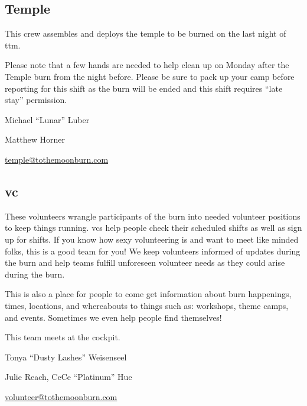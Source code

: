 \begin{multicols}{2}
\subsection*{Temple}
This crew assembles and deploys the \gls{temple} to be burned on the last night of \gls{ttm}.

Please note that a few hands are needed to help clean up on Monday after the Temple burn from the night before. Please be sure to pack up your camp before reporting for this shift as the burn will be ended and this shift requires ``late stay'' permission.

\begin{description}[leftmargin=6em,noitemsep,style=nextline]
   \item[Lead:] Michael ``Lunar'' Luber
   \item[Co-leads:] Matthew Horner
   \item[Contact:] \url{temple@tothemoonburn.com}
\end{description}

\columnbreak

\subsection*{\acrlong{vc}}
These volunteers wrangle participants of the burn into needed volunteer positions to keep things running. \glspl{vc} help people check their scheduled shifts as well as sign up for shifts. If you know how sexy volunteering is and want to meet like minded folks, this is a good team for you! We keep volunteers informed of updates during the burn and help teams fulfill unforeseen volunteer needs as they could arise during the burn.

This is also a place for people to come get information about burn happenings, times, locations, and whereabouts to things such as: workshops, theme camps, and events. Sometimes we even help people find themselves!

This team meets at the \gls{cockpit}.

\begin{description}[leftmargin=6em,noitemsep,style=nextline]
   \item[Lead:] Tonya ``Dusty Lashes'' Weisenseel
   \item[Co-leads:] Julie Reach, CeCe ``Platinum'' Hue
   \item[Contact:] \url{volunteer@tothemoonburn.com}
\end{description}


\end{multicols}

